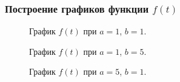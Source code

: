 \documentclass[a5paper, 10pt]{article}
\theoremstyle{definition}
\theoremstyle{plain}
\theoremstyle{remark}
\begin{document}
\subsubsection{Построение графиков функции $f(t)$}

\begin{figure}[h!]
\caption{График $f(t)$ при $a = 1$, $b = 1$.}
\end{figure}


\begin{figure}[h!]
\caption{График $f(t)$ при $a = 1$, $b = 5$.}
\caption{График $f(t)$ при $a = 5$, $b = 1$.}
\end{figure}
\end{document}

